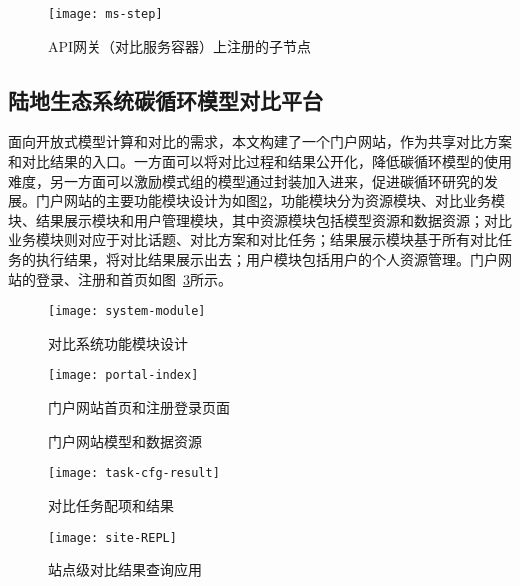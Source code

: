 \begin{figure}[!htbp]
    \centering
    \texttt{[image: ms-step]}
    \caption{API网关（对比服务容器）上注册的子节点}
    \label{fig:api-gateway-children}
\end{figure}

\subsection{陆地生态系统碳循环模型对比平台}
面向开放式模型计算和对比的需求，本文构建了一个门户网站，作为共享对比方案和对比结果的入口。一方面可以将对比过程和结果公开化，降低碳循环模型的使用难度，另一方面可以激励模式组的模型通过封装加入进来，促进碳循环研究的发展。门户网站的主要功能模块设计为如图\ref{fig:system-module}，功能模块分为资源模块、对比业务模块、结果展示模块和用户管理模块，其中资源模块包括模型资源和数据资源；对比业务模块则对应于对比话题、对比方案和对比任务；结果展示模块基于所有对比任务的执行结果，将对比结果展示出去；用户模块包括用户的个人资源管理。门户网站的登录、注册和首页如图~\ref{fig:portal-index}所示。

\begin{figure}[!htbp]
    \centering
    \texttt{[image: system-module]}
    \caption{对比系统功能模块设计}
    \label{fig:system-module}
\end{figure}

\begin{figure}[!htbp]
    \centering
    \texttt{[image: portal-index]}
    \caption{门户网站首页和注册登录页面}
    \label{fig:portal-index}
\end{figure}

\begin{figure}[!htbp]
    \centering
    \hfill
    \caption{门户网站模型和数据资源}
    \label{fig:portal-resource}
\end{figure}

\begin{figure}[!htbp]
    \centering
    \texttt{[image: task-cfg-result]}
    \caption{对比任务配项和结果}
    \label{fig:task-cfg-result}
\end{figure}

\begin{figure}[!htbp]
    \centering
    \texttt{[image: site-REPL]}
    \caption{站点级对比结果查询应用}
    \label{fig:site-REPL}
\end{figure}

